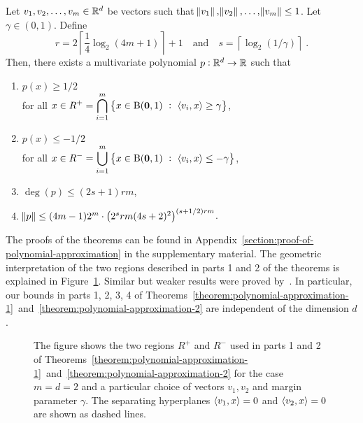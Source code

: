\begin{theorem}
\label{theorem:polynomial-approximation-2}
Let $v_1, v_2, \dots, v_m \in \mathbb{R}^d$ be vectors such that $\norm{v_1},
\norm{v_2}, \dots, \norm{v_m} \le 1$. Let $\gamma \in (0,1)$.
Define
$$
r = 2 \left\lceil \frac{1}{4} \log_2(4m + 1) \right\rceil + 1 \quad \text{and} \quad s = \left \lceil \log_2(1/\gamma) \right \rceil \; .
$$
Then, there exists a multivariate polynomial $p:\mathbb{R}^d \to \mathbb{R}$ such that
\begin{enumerate}
\item $\displaystyle p(x) \ge 1/2$ \\
for all $\displaystyle x \in R^+ = \bigcap_{i=1}^m \left\{ x \in \operatorname{B}(\mathbf{0},1) ~:~ \left\langle v_i, x \right\rangle \ge \gamma \right\}$,

\item $\displaystyle p(x) \le - 1/2$ \\
for all $\displaystyle x \in R^- = \bigcup_{i=1}^m \left\{ x \in \operatorname{B}(\mathbf{0},1) ~:~ \left\langle v_i, x \right\rangle \le - \gamma \right\}$,

\item $\deg(p) \le (2s+1) rm$,
\item $\norm{p} \le (4m-1) 2^m \cdot \left(2^s rm (4s+2)^2 \right)^{(s+1/2)rm}$.
\end{enumerate}
\end{theorem}

The proofs of the theorems can be found in
Appendix~\ref{section:proof-of-polynomial-approximation} in the supplementary
material. The geometric interpretation of the two regions described in parts 1
and 2 of the theorems is explained in Figure~\ref{figure:pizza-slice}. Similar
but weaker results were proved by~\citet{Klivans-Servedio-2008}. In particular,
our bounds in parts 1, 2, 3, 4 of
Theorems~\ref{theorem:polynomial-approximation-1}~and~\ref{theorem:polynomial-approximation-2}
are independent of the dimension $d$.

\begin{figure}
\begin{center}

\end{center}
\caption[]{The figure shows the two regions $R^+$ and $R^-$ used in parts 1 and
2 of
Theorems~\ref{theorem:polynomial-approximation-1}~and~\ref{theorem:polynomial-approximation-2}
for the case $m=d=2$ and a particular choice of vectors $v_1, v_2$ and margin
parameter $\gamma$. The separating hyperplanes $\left\langle v_1, x \right\rangle = 0$ and
$\left\langle v_2, x \right\rangle = 0$ are shown as dashed lines.}
\label{figure:pizza-slice}
\end{figure}

